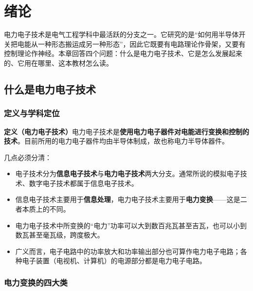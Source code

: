 \chapter{绪论}

电力电子技术是电气工程学科中最活跃的分支之一。它研究的是“如何用半导体开关把电能从一种形态搬运成另一种形态”，因此它既要有电路理论作骨架，又要有控制理论作神经。本章回答四个问题：什么是电力电子技术、它是怎么发展起来的、它用在哪里、这本教材怎么读。

\section{什么是电力电子技术}

\subsection{定义与学科定位}

\begin{tcolorbox}[enhanced,breakable,colback=highlight,colframe=yhbAccent!30!white,boxrule=0.5pt,arc=2.5pt,left=11pt,right=11pt,top=9pt,bottom=9pt,boxsep=0pt,before skip=11pt,after skip=11pt]
\textbf{\color{yhbAccent}定义（电力电子技术）}\quad 电力电子技术是\textbf{使用电力电子器件对电能进行变换和控制的技术}。目前所用的电力电子器件均由半导体制成，故也称电力半导体器件。
\end{tcolorbox}

几点必须分清：

\begin{itemize}
  \item 电子技术分为\textbf{信息电子技术}与\textbf{电力电子技术}两大分支。通常所说的模拟电子技术、数字电子技术都属于信息电子技术。
  \item 信息电子技术主要用于\textbf{信息处理}，电力电子技术主要用于\textbf{电力变换}——这是二者本质上的不同。
  \item 电力电子技术中所变换的“电力”功率可以大到数百兆瓦甚至吉瓦，也可以小到数瓦甚至毫瓦级，跨度极大。
  \item 广义而言，电子电路中的功率放大和功率输出部分也可算作电力电子电路；各种电子装置（电视机、计算机）的电源部分都是电力电子电路。
\end{itemize}

\subsection{电力变换的四大类}

